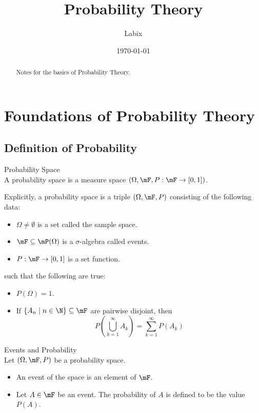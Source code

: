 \documentclass[a4paper]{article}
\title{Probability Theory}
\author{Labix}
\date{\today}
\begin{document}
\maketitle
\begin{abstract}
Notes for the basics of Probability Theory. 
\end{abstract}
\pagebreak
\tableofcontents
\pagebreak

\section{Foundations of Probability Theory}
\subsection{Definition of Probability}
\begin{defn}{Probability Space}{}\\
A probability space is a measure space $(\Omega,\mF,P:\mF\to[0,1])$. 
\end{defn}

Explicitly, a probability space is a triple $(\Omega,\mF,P)$ consisting of the following data: 
\begin{itemize}
\item $\Omega\neq\emptyset$ is a set called the sample space. 
\item $\mF\subseteq\mP(\Omega)$ is a $\sigma$-algebra called events. 
\item $P:\mF\to[0,1]$ is a set function. 
\end{itemize}
such that the following are true: 
\begin{itemize}
\item $P(\Omega)=1$. 
\item If $\{A_n\;|\;n\in\N\}\subseteq\mF$ are pairwise disjoint, then $$P\left(\bigcup_{k=1}^\infty A_k\right)=\sum_{k=1}^{\infty}P(A_k)$$
\end{itemize}

\begin{defn}{Events and Probability}{}\\
Let $(\Omega,\mF,P)$ be a probability space. 
\begin{itemize}
\item An event of the space is an element of $\mF$. 
\item Let $A\in\mF$ be an event. The probability of $A$ is defined to be the value $P(A)$. 
\end{itemize}
\end{defn}
\end{document}
